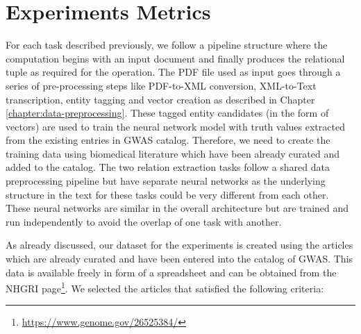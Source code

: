 \section{Experiments Metrics}
\label{section:experiment-metrics}
For each task described previously, we follow a pipeline structure where the computation begins with an input document and finally produces the relational tuple as required for the operation. The PDF file used as input goes through a series of pre-processing steps like PDF-to-XML conversion, XML-to-Text transcription, entity tagging and vector creation as described in Chapter \ref{chapter:data-preprocessing}. These tagged entity candidates (in the form of vectors) are used to train the neural network model with truth values extracted from the existing entries in GWAS catalog. Therefore, we need to create the training data using biomedical literature which have been already curated and added to the catalog. The two relation extraction tasks follow a shared data preprocessing pipeline but have separate neural networks as the underlying structure in the text for these tasks could be very different from each other. These neural networks are similar in the overall architecture but are trained and run independently to avoid the overlap of one task with another.

As already discussed, our dataset for the experiments is created using the articles which are already curated and have been entered into the catalog of GWAS. This data is available freely in form of a spreadsheet and can be obtained from the NHGRI page\footnote{\url{https://www.genome.gov/26525384/}}. We selected the articles that satisfied the following criteria:


